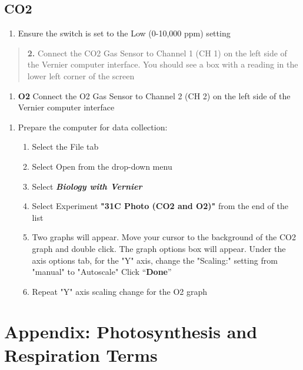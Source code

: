 \documentclass[
  letterpaper,
  DIV=11,
  numbers=noendperiod]{scrreprt}
\providecommand{\tightlist}{%
  \setlength{\itemsep}{0pt}\setlength{\parskip}{0pt}}
\begin{document}
\subsection{\texorpdfstring{\textbf{CO2}}{CO2}}\label{co2}

\begin{enumerate}
\def\labelenumi{\arabic{enumi}.}
\tightlist
\item
  Ensure the switch is set to the Low (0-10,000 ppm) setting
\end{enumerate}

\begin{quote}
\textbf{2.} Connect the CO2 Gas Sensor to Channel 1 (CH 1) on the left
side of the Vernier computer interface. You should see a box with a
reading in the lower left corner of the screen
\end{quote}

\begin{enumerate}
\def\labelenumi{\alph{enumi}.}
\setcounter{enumi}{1}
\tightlist
\item
  \textbf{O2} Connect the O2 Gas Sensor to Channel 2 (CH 2) on the left
  side of the Vernier computer interface
\end{enumerate}

\begin{enumerate}
\def\labelenumi{\arabic{enumi}.}
\setcounter{enumi}{5}
\item
  Prepare the computer for data collection:

  \begin{enumerate}
  \def\labelenumii{\alph{enumii}.}
  \item
    Select the File tab
  \item
    Select Open from the drop-down menu
  \item
    Select \textbf{\emph{Biology with Vernier}}
  \item
    Select Experiment \textbf{"31C Photo (CO2 and O2)"} from the end of
    the list
  \item
    Two graphs will appear. Move your cursor to the background of the
    CO2 graph and double click. The graph options box will appear. Under
    the axis options tab, for the "Y" axis, change the "Scaling:"
    setting from "manual" to "Autoscale" Click ``\textbf{Done}''
  \item
    Repeat "Y" axis scaling change for the O2 graph
  \end{enumerate}
\end{enumerate}

\section{\texorpdfstring{\textbf{Appendix: Photosynthesis and
Respiration
Terms}}{Appendix: Photosynthesis and Respiration Terms}}\label{appendix-photosynthesis-and-respiration-terms}
\end{document}
